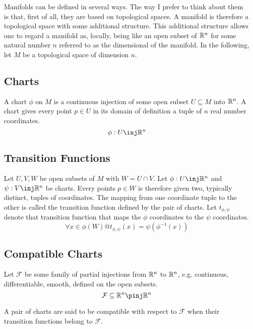\documentclass[11pt, oneside]{article}
\begin{document}
Manifolds can be defined in several ways.
The way I prefer to think about them is that, first of all, they are  based on topological spaces.
A manifold is therefore a topological space with some additional structure.
This additional structure allows one to regard a manifold as, locally, being like an open subset of $\mathbb{R}^n$
for some natural number $n$ referred to as the dimensional of the manifold.
In the following, let $M$ be a topological space of dimension $n$.

\subsection{Charts}
A chart $\phi$ on $M$ is a continuous injection of some open subset $U \subseteq M$ into $\mathbb{R}^n$.
A chart gives every point $p \in U$ in its domain of definition a tuple of $n$ real number coordinates.
\begin{equation}
	\phi: U \inj \R^n
\end{equation}

\subsection{Transition Functions}
Let $U, V, W$ be open subsets of $M$ with $W = U \cap V$.
Let $\phi: U \inj \R^n$ and $\psi: V \inj \R^n$ be charts.
Every points $p \in W$ is therefore given two, typically distinct, tuples of coordinates.
The mapping from one coordinate tuple to the other is called the transition function defined by the pair of charts.
Let $t_{\phi,\psi}$ denote that transition function that maps the $\phi$ coordinates to the $\psi$ coordinates.
\begin{equation}
	\forall x \in \phi(W) @ t_{\phi,\psi}(x) = \psi(\phi^{-1}(x))
\end{equation}

\subsection{Compatible Charts}
Let $\mathcal{F}$ be some family of partial injections from $\mathbb{R}^n$ to $\mathbb{R}^n$, e.g. continuous, differentiable, smooth, defined on the open subsets.
\begin{equation}
	\mathcal{F} \subseteq \R^n \pinj \R^n
\end{equation}

A pair of charts are said to be compatible with respect to $\mathcal{F}$ when their transition functions belong to $\mathcal{F}$.
\end{document}
